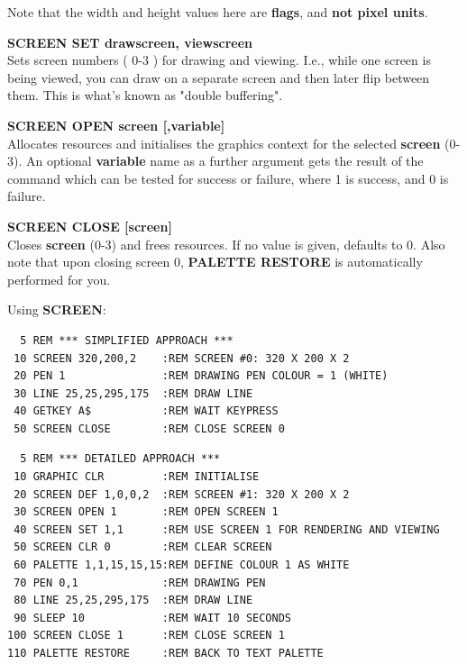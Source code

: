 \begin{description}[leftmargin=2cm,style=nextline]
                Note that the width and height values here are {\bf flags},
                and {\bf not pixel units}.

                {\bf SCREEN SET drawscreen, viewscreen} \\
                Sets screen numbers
                ( 0-3 ) for drawing and viewing. I.e.,
                while one screen is being viewed, you can draw on a
                separate screen and then later flip between them. This
                is what's known as "double buffering".

                {\bf SCREEN OPEN screen [,variable]} \\
                Allocates resources and
                initialises the graphics context for the selected
                {\bf screen} (0-3). An optional {\bf variable} name as
                a further argument gets the result of the
                command which can be tested for success or failure,
                where 1 is success, and 0 is failure.

                {\bf SCREEN CLOSE [screen] } \\
                Closes {\bf screen} (0-3) and frees resources. If no value is given,
                defaults to 0. Also note that upon closing screen 0,
                {\bf PALETTE RESTORE} is automatically performed for you.

\item [Examples:] Using {\bf SCREEN}:
\begin{tcolorbox}[colback=black,coltext=white]
\verbatimfont{\codefont}
\begin{verbatim}
  5 REM *** SIMPLIFIED APPROACH ***
 10 SCREEN 320,200,2    :REM SCREEN #0: 320 X 200 X 2
 20 PEN 1               :REM DRAWING PEN COLOUR = 1 (WHITE)
 30 LINE 25,25,295,175  :REM DRAW LINE
 40 GETKEY A$           :REM WAIT KEYPRESS
 50 SCREEN CLOSE        :REM CLOSE SCREEN 0
\end{verbatim}
\end{tcolorbox}
\begin{tcolorbox}[colback=black,coltext=white]

\verbatimfont{\codefont}
\begin{verbatim}
  5 REM *** DETAILED APPROACH ***
 10 GRAPHIC CLR         :REM INITIALISE
 20 SCREEN DEF 1,0,0,2  :REM SCREEN #1: 320 X 200 X 2
 30 SCREEN OPEN 1       :REM OPEN SCREEN 1
 40 SCREEN SET 1,1      :REM USE SCREEN 1 FOR RENDERING AND VIEWING
 50 SCREEN CLR 0        :REM CLEAR SCREEN
 60 PALETTE 1,1,15,15,15:REM DEFINE COLOUR 1 AS WHITE
 70 PEN 0,1             :REM DRAWING PEN
 80 LINE 25,25,295,175  :REM DRAW LINE
 90 SLEEP 10            :REM WAIT 10 SECONDS
100 SCREEN CLOSE 1      :REM CLOSE SCREEN 1
110 PALETTE RESTORE     :REM BACK TO TEXT PALETTE
\end{verbatim}
\end{tcolorbox}
\end{description}

